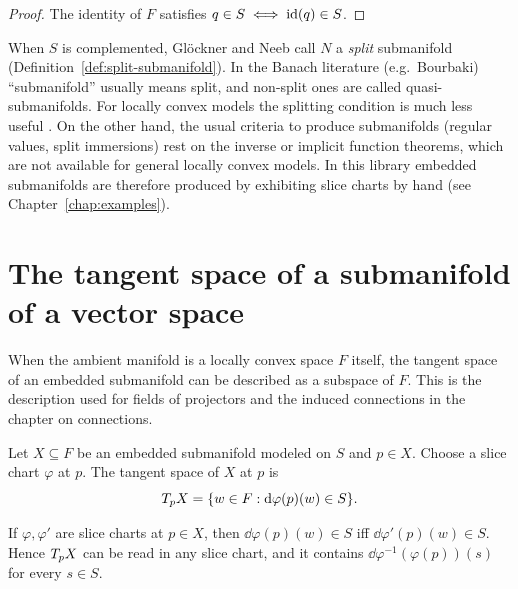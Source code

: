 \begin{proof}
  \leanok
  The identity of $F$ satisfies $q \in S \iff \mathrm{id}(q) \in S$.
\end{proof}

\begin{remark}
  \label{rem:sub-embedded-subtleties}
  When $S$ is complemented, Glöckner and Neeb call $N$ a \emph{split} submanifold
  (Definition~\ref{def:split-submanifold}). In the Banach literature (e.g.\ Bourbaki)
  ``submanifold'' usually means split, and non-split ones are called quasi-submanifolds. For
  locally convex models the splitting condition is much less useful
  \cite[Rem.~3.1.11]{GN26}. On the other hand, the usual criteria to produce submanifolds
  (regular values, split immersions) rest on the inverse or implicit function theorems, which
  are not available for general locally convex models. In this library embedded submanifolds
  are therefore produced by exhibiting slice charts by hand (see Chapter~\ref{chap:examples}).
\end{remark}

\section{The tangent space of a submanifold of a vector space}

When the ambient manifold is a locally convex space $F$ itself, the tangent space of an
embedded submanifold can be described as a subspace of $F$. This is the description used for
fields of projectors and the induced connections in the chapter on connections.

\begin{definition}
  \label{def:tangent-space-submanifold}
  \leanok
  Let $X \subseteq F$ be an embedded submanifold modeled on $S$ and $p \in X$. Choose a slice
  chart $\varphi$ at $p$. The tangent space of $X$ at $p$ is
  \[
    T_p X = \{ w \in F : \mathrm{d}\varphi(p)(w) \in S \}.
  \]
\end{definition}

\begin{lemma}
  \label{lem:sub-tangent-chart}
  \leanok
  If $\varphi, \varphi'$ are slice charts at $p \in X$, then $\dd\varphi(p)(w) \in S$ iff
  $\dd\varphi'(p)(w) \in S$. Hence $T_p X$ can be read in any slice chart, and it contains
  $\dd\varphi^{-1}(\varphi(p))(s)$ for every $s \in S$.
\end{lemma}

